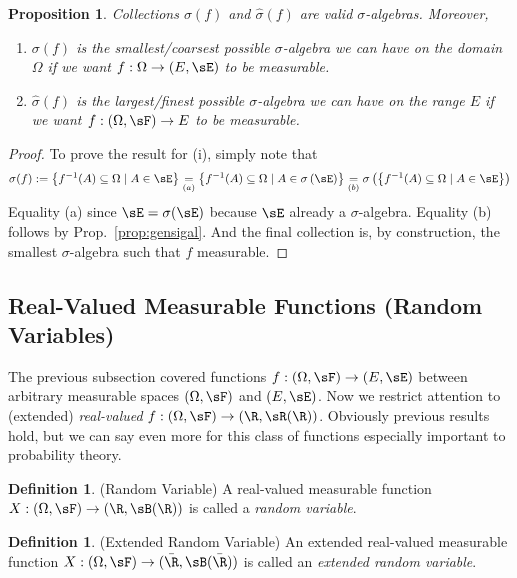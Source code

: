 \documentclass[12pt]{article}
\theoremstyle{plain}
\newtheorem{prop}[thm]{Proposition}
\theoremstyle{definition}
\newtheorem{defn}[thm]{Definition}
\theoremstyle{remark}
\newcommand{\ra}{\rightarrow}
\begin{document}
\begin{prop}
Collections $\sigma(f)$ and $\hat{\sigma}(f)$ are valid
$\sigma$-algebras. Moreover,
\begin{enumerate}[label=\emph{(\roman*)}]
  \item  $\sigma(f)$ is the \emph{smallest/coarsest} possible $\sigma$-algebra
    we can have on the domain $\Omega$ if we want $f:\Omega\ra(E,\sE)$
    to be measurable.
  \item $\hat{\sigma}(f)$ is the \emph{largest/finest} possible
    $\sigma$-algebra we can have on the range $E$ if we want
    $f:(\Omega,\sF)\ra E$ to be measurable.
\end{enumerate}
\end{prop}
\begin{proof}
To prove the result for (i), simply note that
\begin{align*}
  \sigma(f):=
  \left\{ f^{-1}(A) \subseteq\Omega\;|\; A\in \sE \right\}
  \underset{(a)}{=}
  \left\{ f^{-1}(A) \subseteq\Omega\;|\; A\in\sigma\left( \sE \right)\right\}
  \underset{(b)}{=}
  \sigma\left( \left\{ f^{-1}(A) \subseteq\Omega\;|\; A\in\sE \right\} \right)
\end{align*}
Equality (a) since $\sE=\sigma(\sE)$ because $\sE$ already a
$\sigma$-algebra.
Equality (b) follows by Prop.~\ref{prop:gensigal}.
And the final collection is, by construction, the smallest
$\sigma$-algebra such that $f$ measurable.
\end{proof}


\clearpage
\subsection{%
  Real-Valued Measurable Functions (Random Variables)
}

The previous subsection covered functions
$f:(\Omega,\sF)\ra(E,\sE)$ between arbitrary measurable spaces
$(\Omega,\sF)$ and $(E,\sE)$. Now we restrict attention to
(extended) \emph{real-valued} $f:(\Omega,\sF)\ra(\R,\sR(\R))$.
Obviously previous results hold, but we can say even more for this
class of functions especially important to probability theory.

\begin{defn}(Random Variable)
A real-valued measurable function $X:(\Omega,\sF)\ra (\R,\sB(\R))$
is called a \emph{random variable}.
\end{defn}

\begin{defn}(Extended Random Variable)
An extended real-valued measurable function $X:(\Omega,\sF)\ra
(\bar{\R},\sB(\bar{\R}))$ is called an \emph{extended random variable}.
\end{defn}
\end{document}
